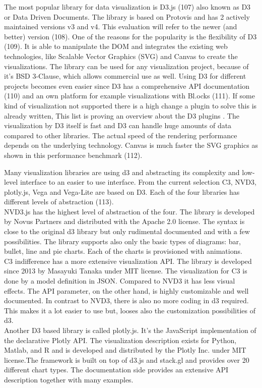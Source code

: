 \documentclass[american,a4paper,oneside,,tablecaptionabove]{scrbook}
\begin{document}
The most popular library for data visualization is D3.js (107) also
known as D3 or Data Driven Documents. The library is based on Protovis
and has 2 actively maintained versions v3 and v4. This evaluation will
refer to the newer (and better) version (108). One of the reasons for
the popularity is the flexibility of D3 (109). It is able to manipulate
the DOM and integrates the existing web technologies, like Scalable
Vector Graphics (SVG) and Canvas to create the visualizations. The
library can be used for any visualization project, because of it's BSD
3-Clause, which allows commercial use as well. Using D3 for different
projects becomes even easier since D3 has a comprehensive API
documentation (110) and an own platform for example visualizations with
Bl.ocks (111). If some kind of visualization not supported there is a
high change a plugin to solve this is already written, This list is
proving an overview about the D3 plugins \cite{awesome-d3}. The
visualization by D3 itself is fast and D3 can handle huge amounts of
data compared to other libraries. The actual speed of the rendering
performance depends on the underlying technology. Canvas is much faster
the SVG graphics as shown in this performance benchmark (112).

Many visualization libraries are using d3 and abstracting its complexity
and low-level interface to an easier to use interface. From the current
selection C3, NVD3, plotly.js, Vega and Vega-Lite are based on D3. Each
of the four libraries has different levels of abstraction (113).\\
NVD3.js has the highest level of abstraction of the four. The library is
developed by Novus Partners and distributed with the Apache 2.0 license.
The syntax is close to the original d3 library but only rudimental
documented and with a few possibilities. The library supports also only
the basic types of diagrams: bar, bullet, line and pie charts. Each of
the charts is provisioned with animations.\\
C3 indifference has a more extensive visualization API. The library is
developed since 2013 by Masayuki Tanaka under MIT license. The
visualization for C3 is done by a model definition in JSON. Compared to
NVD3 it has less visual effects. The API parameter, on the other hand,
is highly customizable and well documented. In contrast to NVD3, there
is also no more coding in d3 required. This makes it a lot easier to use
but, looses also the customization possibilities of d3.\\
Another D3 based library is called plotly.js. It's the JavaScript
implementation of the declarative Plotly API. The visualization
description exists for Python, Matlab, and R and is developed and
distributed by the Plotly Inc. under MIT license.The framework is built
on top of d3.js and stack.gl and provides over 20 different chart types.
The documentation side provides an extensive API description together
with many examples.
\end{document}
